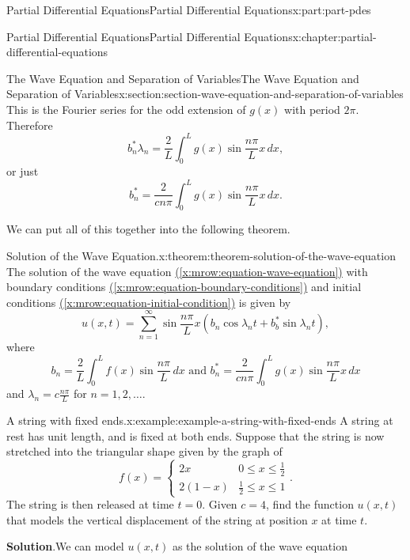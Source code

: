 \documentclass[oneside,10pt,]{book}
\newcommand{\blocktitlefont}{\relax}
\newcommand{\xreffont}{\relax}
\numberwithin{equation}{part}
\newcommand{\amp}{&}
\begin{document}
\begin{partptx}{Partial Differential Equations}{}{Partial Differential Equations}{}{}{x:part:part-pdes}
\begin{chapterptx}{Partial Differential Equations}{}{Partial Differential Equations}{}{}{x:chapter:partial-differential-equations}
\begin{sectionptx}{The Wave Equation and Separation of Variables}{}{The Wave Equation and Separation of Variables}{}{}{x:section:section-wave-equation-and-separation-of-variables}
This is the Fourier series for the odd extension of \(g(x)\) with period \(2\pi\). Therefore%
\begin{equation*}
b^{*}_{n}\lambda_{n} = \frac{2}{L}\int_{0}^{L}g(x)\sin\frac{n\pi}{L}x\,dx,
\end{equation*}
or just%
\begin{equation*}
b^{*}_{n} = \frac{2}{cn\pi}\int_{0}^{L}g(x)\sin\frac{n\pi}{L}x\,dx.
\end{equation*}
%
\par
We can put all of this together into the following theorem.%
\begin{theorem}{Solution of the Wave Equation.}{}{x:theorem:theorem-solution-of-the-wave-equation}%
%
The solution of the wave equation \hyperref[x:mrow:equation-wave-equation]{({\xreffont\ref{x:mrow:equation-wave-equation}})} with boundary conditions \hyperref[x:mrow:equation-boundary-conditions]{({\xreffont\ref{x:mrow:equation-boundary-conditions}})} and initial conditions \hyperref[x:mrow:equation-initial-condition]{({\xreffont\ref{x:mrow:equation-initial-condition}})} is given by%
\begin{equation*}
u(x,t) = \sum_{n=1}^{\infty}\sin\frac{n\pi}{L}x(b_{n}\cos\lambda_{n}t+b^{*}_{b}\sin\lambda_{n}t),
\end{equation*}
where%
\begin{equation*}
b_{n} = \frac{2}{L}\int_{0}^{L}f(x)\sin\frac{n\pi}{L}\,dx\text{ and }b^{*}_{n} = \frac{2}{cn\pi}\int_{0}^{L}g(x)\sin\frac{n\pi}{L}x\,dx
\end{equation*}
and \(\lambda_{n} = c\frac{n\pi}{L}\) for \(n=1,2,\ldots\).%
\end{theorem}
\begin{example}{A string with fixed ends.}{x:example:example-a-string-with-fixed-ends}%
A string at rest has unit length, and is fixed at both ends. Suppose that the string is now stretched into the triangular shape given by the graph of%
\begin{equation*}
f(x) = \begin{cases} 2x \amp 0\leq x\leq \frac{1}{2} \\ 2(1-x) \amp \frac{1}{2}\leq x\leq 1 \end{cases}.
\end{equation*}
The string is then released at time \(t=0\). Given \(c=4\), find the function \(u(x,t)\) that models the vertical displacement of the string at position \(x\) at time \(t\).%
\par\smallskip%
\noindent\textbf{\blocktitlefont Solution}.\hypertarget{g:solution:idp105548780955680}{}\quad{}We can model \(u(x,t)\) as the solution of the wave equation%

\end{example}
\end{sectionptx}
\end{chapterptx}
\end{partptx}
\end{document}
